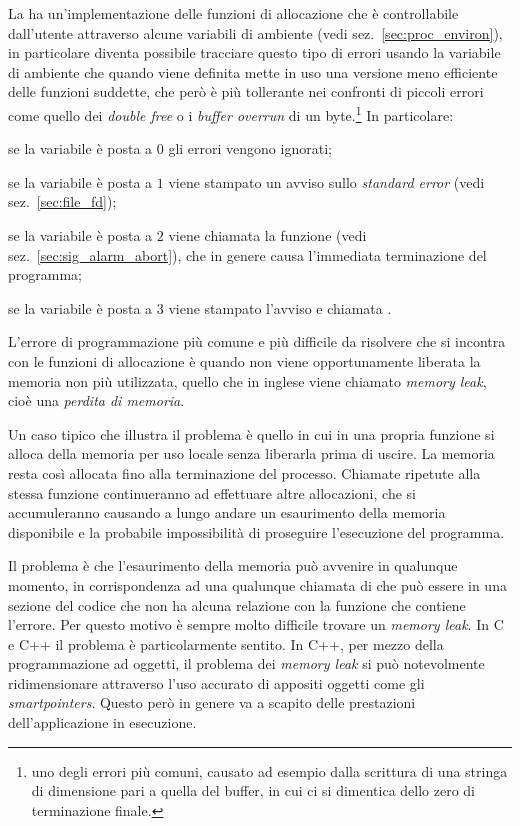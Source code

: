 La  ha un'implementazione delle funzioni di allocazione che è
controllabile dall'utente attraverso alcune variabili di ambiente (vedi
sez.~\ref{sec:proc_environ}), in particolare diventa possibile tracciare
questo tipo di errori usando la variabile di ambiente 
che quando viene definita mette in uso una versione meno efficiente delle
funzioni suddette, che però è più tollerante nei confronti di piccoli errori
come quello dei \textit{double free} o i \textit{buffer overrun} di un
byte.\footnote{uno degli errori più comuni, causato ad esempio dalla scrittura
  di una stringa di dimensione pari a quella del buffer, in cui ci si
  dimentica dello zero di terminazione finale.}  In particolare:
\begin{itemize*}
\item se la variabile è posta a $0$ gli errori vengono ignorati;
\item se la variabile è posta a $1$ viene stampato un avviso sullo
  \textit{standard error} (vedi sez.~\ref{sec:file_fd});
\item se la variabile è posta a $2$ viene chiamata la funzione 
  (vedi sez.~\ref{sec:sig_alarm_abort}), che in genere causa l'immediata
  terminazione del programma;
\item se la variabile è posta a $3$ viene stampato l'avviso e chiamata
  . 
\end{itemize*}


L'errore di programmazione più comune e più difficile da risolvere che si
incontra con le funzioni di allocazione è quando non viene opportunamente
liberata la memoria non più utilizzata, quello che in inglese viene chiamato
\textit{memory leak}, cioè una \textsl{perdita di memoria}.

Un caso tipico che illustra il problema è quello in cui in una propria
funzione si alloca della memoria per uso locale senza liberarla prima di
uscire. La memoria resta così allocata fino alla terminazione del processo.
Chiamate ripetute alla stessa funzione continueranno ad effettuare altre
allocazioni, che si accumuleranno causando a lungo andare un esaurimento della
memoria disponibile e la probabile impossibilità di proseguire l'esecuzione
del programma.

Il problema è che l'esaurimento della memoria può avvenire in qualunque
momento, in corrispondenza ad una qualunque chiamata di  che può
essere in una sezione del codice che non ha alcuna relazione con la funzione
che contiene l'errore. Per questo motivo è sempre molto difficile trovare un
\textit{memory leak}.  In C e C++ il problema è particolarmente sentito. In
C++, per mezzo della programmazione ad oggetti, il problema dei \textit{memory
  leak} si può notevolmente ridimensionare attraverso l'uso accurato di
appositi oggetti come gli \textit{smartpointers}.  Questo però in genere va a
scapito delle prestazioni dell'applicazione in esecuzione.


